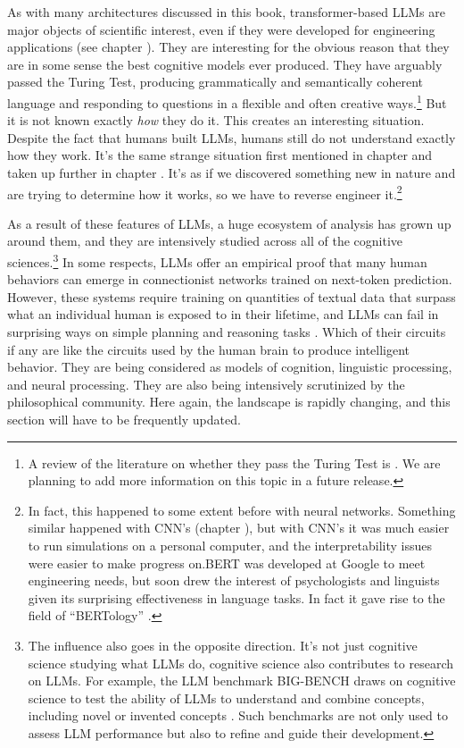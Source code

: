 As with many architectures discussed in this book, transformer-based LLMs are major objects of scientific interest, even if they were developed for engineering applications (see chapter ). They are interesting for the obvious reason that they are in some sense the best cognitive models ever produced. They have arguably passed the Turing Test, producing grammatically and semantically coherent language and responding to questions in a flexible and often creative ways.\footnote{A review of the literature on whether they pass the Turing Test is \cite{jones2024does}. We are planning to add more information on this topic in a future release.} But it is not known exactly \emph{how} they do it. This creates an interesting situation. Despite the fact that humans built LLMs, humans still do not understand exactly how they work. It's the same strange situation first mentioned in chapter  and taken up further in chapter . It's as if we discovered something new in nature and are trying to determine how it works, so we have to  reverse engineer it.\footnote{In fact, this happened  to some extent before with neural networks. Something similar happened with CNN's (chapter ), but with CNN's it was much easier to  run simulations on a personal computer, and the interpretability issues were easier to make progress on.BERT was developed at Google to meet engineering needs, but soon drew the interest of psychologists and linguists given its surprising effectiveness in language tasks. In fact it gave rise to the field of  ``BERTology'' \cite{rogers2020primer}.}

As a result of these features of LLMs, a huge ecosystem of analysis has grown up around them, and they are intensively studied across all of the cognitive sciences.\footnote{The influence also goes in the opposite direction. It's not just cognitive science studying what LLMs do, cognitive science also contributes to research on LLMs. For example, the LLM benchmark BIG-BENCH draws on cognitive science to test the ability of LLMs to understand and combine concepts, including novel or invented concepts \cite{srivastava2022beyond}. Such benchmarks are not only used to assess LLM performance but also to refine and guide their development.} In some respects, LLMs offer an empirical proof that many human behaviors can emerge in connectionist networks trained on next-token prediction. However, these systems require training on quantities of textual data that surpass what an individual human is exposed to in their lifetime, and LLMs can fail in surprising ways on simple planning and reasoning tasks \cite{momennejad2023cogeval}. Which of their circuits if any are like the circuits used by the human brain to produce intelligent behavior. They are being considered as models of cognition, linguistic processing, and neural processing. They are also being intensively scrutinized by the philosophical community. Here again, the landscape is rapidly changing, and this section will have to be frequently updated.

